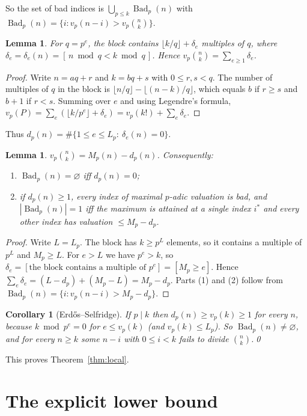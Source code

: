\documentclass[11pt]{amsart}
\newtheorem{lemma}[theorem]{Lemma}
\newtheorem{corollary}[theorem]{Corollary}
\theoremstyle{remark}
\DeclareMathOperator{\Bad}{Bad}
\begin{document}
So the set of bad indices is $\bigcup_{p\le k}\Bad_p(n)$ with $\Bad_p(n)=\{i: v_p(n-i)>v_p\binom nk\}$.

\begin{lemma}\label{lem:2}
For $q=p^e$, the block contains $\lfloor k/q\rfloor+\delta_e$ multiples of $q$, where $\delta_e=\delta_e(n)=[\,n\bmod q<k\bmod q\,]$. Hence $v_p\binom nk=\sum_{e\ge1}\delta_e$.
\end{lemma}
\begin{proof}
Write $n=aq+r$ and $k=bq+s$ with $0\le r,s<q$. The number of multiples of $q$ in the block is $\lfloor n/q\rfloor-\lfloor(n-k)/q\rfloor$, which equals $b$ if $r\ge s$ and $b+1$ if $r<s$. Summing over $e$ and using Legendre's formula, $v_p(P)=\sum_e(\lfloor k/p^e\rfloor+\delta_e)=v_p(k!)+\sum_e\delta_e$.
\end{proof}

Thus $d_p(n)=\#\{1\le e\le L_p:\ \delta_e(n)=0\}$.

\begin{lemma}\label{lem:3}
$v_p\binom nk=M_p(n)-d_p(n)$. Consequently:
\begin{enumerate}
\item $\Bad_p(n)=\varnothing$ iff $d_p(n)=0$;
\item if $d_p(n)\ge1$, every index of maximal $p$-adic valuation is bad, and $|\Bad_p(n)|=1$ iff the maximum is attained at a single index $i^*$ and every other index has valuation $\le M_p-d_p$.
\end{enumerate}
\end{lemma}
\begin{proof}
Write $L=L_p$. The block has $k\ge p^L$ elements, so it contains a multiple of $p^L$ and $M_p\ge L$. For $e>L$ we have $p^e>k$, so $\delta_e=[\text{the block contains a multiple of }p^e]=[M_p\ge e]$. Hence $\sum_e\delta_e=(L-d_p)+(M_p-L)=M_p-d_p$. Parts (1) and (2) follow from $\Bad_p(n)=\{i: v_p(n-i)>M_p-d_p\}$.
\end{proof}

\begin{corollary}[Erd\H{o}s--Selfridge]\label{cor:4}
If $p\mid k$ then $d_p(n)\ge v_p(k)\ge1$ for every $n$, because $k\bmod p^e=0$ for $e\le v_p(k)$ (and $v_p(k)\le L_p$). So $\Bad_p(n)\ne\varnothing$, and for every $n\ge k$ some $n-i$ with $0\le i<k$ fails to divide $\binom nk$.\qed
\end{corollary}

This proves Theorem~\ref{thm:local}.

\section{The explicit lower bound}\label{sec:lower}
\end{document}
